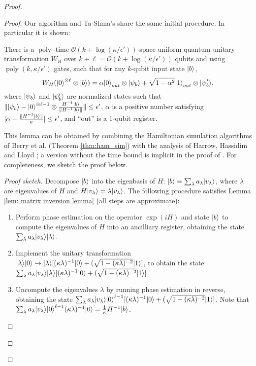 \documentclass[a4paper,UKenglish]{lipics-v2016}
\newcommand\bigoh{\mathcal{O}}
\DeclareMathOperator{\poly}{poly}
\begin{document}
\begin{proof}
\begin{proof}
Our algorithm and Ta-Shma's share the same initial procedure.  In particular it is shown:  
\begin{lemma} \label{lem: matrix inversion lemma}
There is a $\poly$-time $\bigoh (k + \log(\kappa/\epsilon'))$-space uniform quantum unitary transformation $W_H$ over $k+\ell = \bigoh (k+ \log(\kappa/\epsilon'))$ qubits and using $\poly(k,\kappa/\epsilon')$ gates, such that for any $k$-qubit input state ${\left\vert{b}\right\rangle}$,
\begin{equation}
W_H ({\left\vert{0}\right\rangle}^{\otimes \ell} \otimes {\left\vert{b}\right\rangle}) = \alpha {\left\vert{0}\right\rangle}_{out} \otimes {\left\vert{\psi_b}\right\rangle} + \sqrt{1-\alpha^2} {\left\vert{1}\right\rangle}_{out} \otimes{\left\vert{\psi'_b}\right\rangle},
\end{equation}
where ${\left\vert{\psi_b}\right\rangle}$ and ${\left\vert{\psi'_b}\right\rangle}$ are normalized states such that $\| {\left\vert{\psi_b}\right\rangle} - {\left\vert{0}\right\rangle}^{\otimes \ell-1} \otimes \frac{H^{-1}{\left\vert{b}\right\rangle}} {\|H^{-1}{\left\vert{b}\right\rangle}\|} \| \le \epsilon'$, $\alpha$ is a positive number satisfying $|\alpha - \frac{\|H^{-1}{\left\vert{b}\right\rangle}\|}{\kappa}| \le \epsilon'$, and ``out'' is a 1-qubit register.
\end{lemma}
This lemma can be obtained by combining the Hamiltonian simulation algorithms of Berry et al. (Theorem \ref{thm:ham_sim}) with the analysis of Harrow, Hassidim and Lloyd \cite{HHL}; a version without the time bound is implicit in the proof of \cite[Theorem~6.3]{tashma}. For completeness, we sketch the proof below.
\begin{proof}[Proof sketch]
Decompose ${\left\vert{b}\right\rangle}$ into the eigenbasis of $H$: ${\left\vert{b}\right\rangle} = \sum_{\lambda} a_\lambda {\left\vert{v_\lambda}\right\rangle}$, where $\lambda$ are eigenvalues of $H$ and $H{\left\vert{v_\lambda}\right\rangle} = \lambda {\left\vert{v_\lambda}\right\rangle}$. The following procedure satisfies Lemma \ref{lem: matrix inversion lemma} (all steps are approximate):
\begin{enumerate}
\item Perform phase estimation on the operator $\exp(iH)$ and state ${\left\vert{b}\right\rangle}$ to compute the eigenvalues of $H$ into an ancilliary register, obtaining the state $\sum_{\lambda} a_\lambda {\left\vert{v_\lambda}\right\rangle}{\left\vert{\lambda}\right\rangle}$.
\item Implement the unitary transformation ${\left\vert{\lambda}\right\rangle}{\left\vert{0}\right\rangle} \rightarrow {\left\vert{\lambda}\right\rangle}[(\kappa\lambda)^{-1}{\left\vert{0}\right\rangle}+(\sqrt{1-(\kappa\lambda)^{-2}}{\left\vert{1}\right\rangle}]$, to obtain the state $\sum_{\lambda} a_\lambda {\left\vert{v_\lambda}\right\rangle}{\left\vert{\lambda}\right\rangle}[(\kappa\lambda)^{-1}{\left\vert{0}\right\rangle}+(\sqrt{1-(\kappa\lambda)^{-2}}{\left\vert{1}\right\rangle}]$.
\item Uncompute the eigenvalues $\lambda$ by running phase estimation in reverse, obtaining the state
$\sum_{\lambda} a_\lambda {\left\vert{v_\lambda}\right\rangle}{\left\vert{0}\right\rangle}^{\ell-1}[(\kappa\lambda)^{-1}{\left\vert{0}\right\rangle}+(\sqrt{1-(\kappa\lambda)^{-2}}{\left\vert{1}\right\rangle}]$. Note that $\sum_{\lambda} a_\lambda {\left\vert{v_\lambda}\right\rangle}{\left\vert{0}\right\rangle}^{\ell-1}(\kappa\lambda)^{-1}{\left\vert{0}\right\rangle} = \frac{1}{\kappa} H^{-1}{\left\vert{b}\right\rangle}$.

\end{enumerate}
\end{proof}
\end{proof}
\end{proof}
\end{document}
